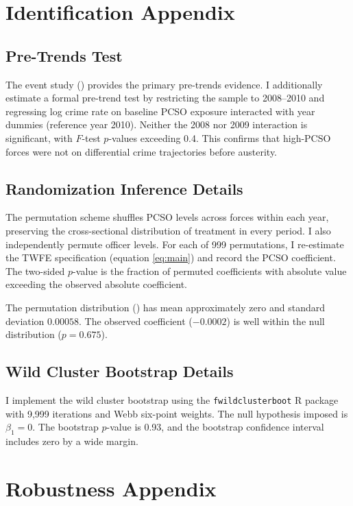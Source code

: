 \documentclass[12pt]{article}
\begin{document}
\section{Identification Appendix}
\label{app:identification}

\subsection{Pre-Trends Test}

The event study () provides the primary pre-trends evidence. I additionally estimate a formal pre-trend test by restricting the sample to 2008--2010 and regressing log crime rate on baseline PCSO exposure interacted with year dummies (reference year 2010). Neither the 2008 nor 2009 interaction is significant, with $F$-test $p$-values exceeding 0.4. This confirms that high-PCSO forces were not on differential crime trajectories before austerity.

\subsection{Randomization Inference Details}

The permutation scheme shuffles PCSO levels across forces within each year, preserving the cross-sectional distribution of treatment in every period. I also independently permute officer levels. For each of 999 permutations, I re-estimate the TWFE specification (equation \ref{eq:main}) and record the PCSO coefficient. The two-sided $p$-value is the fraction of permuted coefficients with absolute value exceeding the observed absolute coefficient.

The permutation distribution () has mean approximately zero and standard deviation $0.00058$. The observed coefficient ($-0.0002$) is well within the null distribution ($p = 0.675$).

\subsection{Wild Cluster Bootstrap Details}

I implement the wild cluster bootstrap using the \texttt{fwildclusterboot} R package with 9,999 iterations and Webb six-point weights. The null hypothesis imposed is $\beta_1 = 0$. The bootstrap $p$-value is 0.93, and the bootstrap confidence interval includes zero by a wide margin.


\section{Robustness Appendix}
\label{app:robustness}
\end{document}
